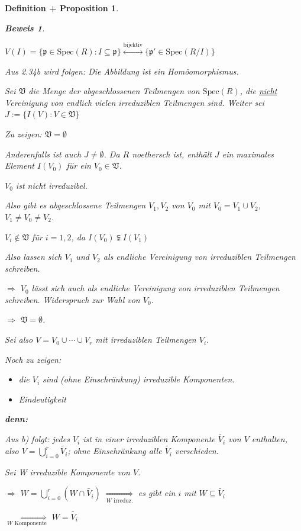 \documentclass[a4paper,12pt]{scrbook}
\theoremstyle{break}
\newtheorem{DefProp}[Def]{Definition + Proposition}
\theoremstyle{nonumberbreak}
\newtheorem{Bew}{Beweis}
\theoremstyle{nonumberplain}
\begin{document}
\begin{DefProp}
\begin{Bew}
\begin{enumerate}
$V(I) = \{ \mathfrak{p} \in \textrm{Spec}(R) : I \subseteq \mathfrak{p} \} \overset{\text{bijektiv}}\longleftrightarrow \{ \mathfrak{p'} \in \textrm{Spec}(R/I) \}$

Aus 2.34b wird folgen: Die Abbildung ist ein Homöomorphismus.

Sei $\mathfrak{V}$ die Menge der abgeschlossenen Teilmengen von $\textrm{Spec}(R)$, die \underline{nicht} Vereinigung von endlich vielen irreduziblen Teilmengen sind. Weiter sei $J := \{ I(V) : V \in \mathfrak{V} \}$

Zu zeigen: $\mathfrak{V} = \emptyset$

Anderenfalls ist auch $J \neq \emptyset$. Da $R$ noethersch ist, enthält $J$ ein maximales Element $I(V_0)$ für ein $V_0 \in \mathfrak{V}$.

$V_0$ ist nicht irreduzibel.

Also gibt es abgeschlossene Teilmengen $V_1, V_2$ von $V_0$ mit $V_0 = V_1 \cup V_2$, $V_1 \neq V_0 \neq V_2$.

$V_i \notin \mathfrak{V}$ für $i = 1,2$, da $I(V_0) \subsetneqq I(V_1)$

Also lassen sich $V_1$ und $V_2$ als endliche Vereinigung von irreduziblen Teilmengen schreiben.

$\Rightarrow$ $V_0$ lässt sich auch als endliche Vereinigung von irreduziblen Teilmengen schreiben. Widerspruch zur Wahl von $V_0$.

$\Rightarrow$ $\mathfrak{V} = \emptyset$.
\bigskip

Sei also $V = V_0 \cup \cdots \cup V_r$ mit irreduziblen Teilmengen $V_i$.

Noch zu zeigen: 
\begin{itemize}
\item die $V_i$ sind (ohne Einschränkung) irreduzible Komponenten.
\item Eindeutigkeit
\end{itemize}

\textbf{denn:}

Aus b) folgt: jedes $V_i$ ist in einer irreduziblen Komponente $\widetilde{V_i}$ von $V$ enthalten, also $V = \bigcup_{i=0}^r \widetilde{V_i}$; ohne Einschränkung alle $\widetilde{V_i}$ verschieden.

Sei W irreduzible Komponente von $V$.

$\Rightarrow$ $W = \bigcup_{i=0}^r (W \cap \widetilde{V_i})$ $\underset{W \text{ irreduz.}}\Rightarrow$ es gibt ein $i$ mit $W \subseteq \widetilde{V_i}$

$\underset{W \text{ Komponente}}\Rightarrow$ $W = \widetilde{V_i}$

\end{enumerate}
\end{Bew}

\end{DefProp}
\end{document}
